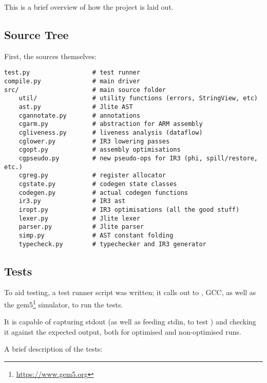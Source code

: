 \documentclass[12pt]{article}
\begin{document}
This is a brief overview of how the project is laid out.

\subsection{Source Tree}

First, the sources themselves:

\begin{verbatim}
test.py                 # test runner
compile.py              # main driver
src/                    # main source folder
	util/               # utility functions (errors, StringView, etc)
	ast.py              # Jlite AST
	cgannotate.py       # annotations
	cgarm.py            # abstraction for ARM assembly
	cgliveness.py       # liveness analysis (dataflow)
	cglower.py          # IR3 lowering passes
	cgopt.py            # assembly optimisations
	cgpseudo.py         # new pseudo-ops for IR3 (phi, spill/restore, etc.)
	cgreg.py            # register allocator
	cgstate.py          # codegen state classes
	codegen.py          # actual codegen functions
	ir3.py              # IR3 ast
	iropt.py            # IR3 optimisations (all the good stuff)
	lexer.py            # Jlite lexer
	parser.py           # Jlite parser
	simp.py             # AST constant folding
	typecheck.py        # typechecker and IR3 generator
\end{verbatim}



\pagebreak
\subsection{Tests}

To aid testing, a test runner script was written; it calls out to , GCC, as well as
the gem5\footnote{\url{https://www.gem5.org}} simulator, to run the tests.

It is capable of capturing stdout (as well as feeding stdin, to test ) and checking it
against the expected output, both for optimised and non-optimised runs.

A brief description of the tests:
\end{document}
